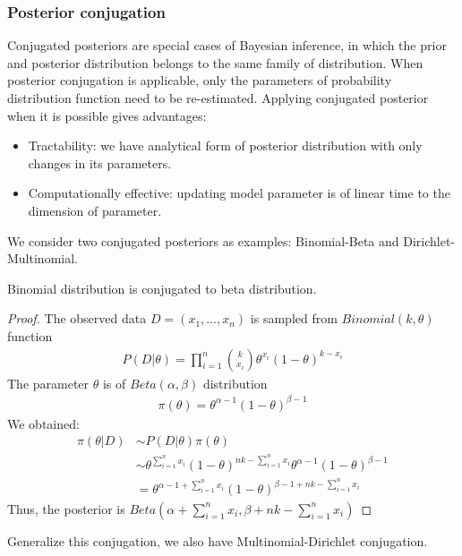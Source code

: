 \subsubsection{Posterior conjugation}
Conjugated posteriors are special cases of Bayesian inference, in which the prior and posterior
distribution belongs to the same family of distribution. When posterior conjugation is applicable,
only the parameters of probability distribution function need to be re-estimated. Applying
conjugated posterior when it is possible gives advantages:
\begin{itemize}
    \item Tractability: we have analytical form of posterior distribution with only changes in its
          parameters.
    \item Computationally effective: updating model parameter is of linear time to the dimension of
          parameter.
\end{itemize}
We consider two conjugated posteriors as examples: Binomial-Beta and Dirichlet-Multinomial.
\begin{lemma}
    Binomial distribution is conjugated to beta distribution.
\end{lemma}
\begin{proof}
    The observed data $D=(x_1,\ldots,x_n)$ is sampled from $Binomial(k, \theta)$ function
    \begin{align*}
        P(D|\theta) = \prod_{i=1}^n{k\choose x_i}\theta^{x_i}(1-\theta)^{k-x_i}
    \end{align*}
    The parameter $\theta$ is of $Beta(\alpha, \beta)$ distribution
    \begin{align*}
        \pi(\theta) = \theta^{\alpha-1}(1-\theta)^{\beta -1}
    \end{align*}
    We obtained:
    \begin{align*}
        \pi(\theta|D) & \sim P(D|\theta)\pi(\theta)                                                                             \\
                      & \sim \theta^{\sum_{i=1}^n x_i}(1-\theta)^{nk -\sum_{i=1}^n x_i} \theta^{\alpha -1} (1-\theta)^{\beta-1} \\
                      & = \theta^{\alpha - 1 + \sum_{i=1}^n x_i}(1-\theta)^{\beta - 1 + nk -\sum_{i=1}^n x_i}
    \end{align*}
    Thus, the posterior is $Beta(\alpha + \sum_{i=1}^n x_i, \beta + nk -\sum_{i=1}^n x_i)$
\end{proof}
Generalize this conjugation, we also have Multinomial-Dirichlet conjugation.
